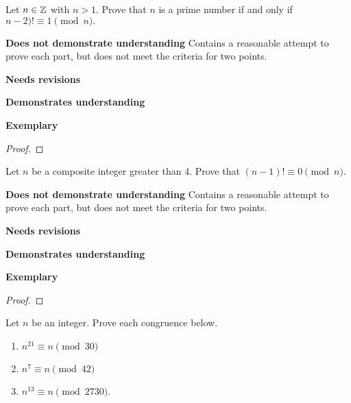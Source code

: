 \documentclass[letterpaper, 11pt]{../ximera}
\begin{document}
\begin{ex}[Exercise 44]
	Let $n\in\mathbb Z$ with $n>1.$ Prove that $n$ is a prime number if and only if $n-2)!\equiv 1\pmod{n}.$
\end{ex}

\begin{writeRubric}
    \item \textbf{Does not demonstrate understanding}
     Contains a reasonable attempt to prove each part, but does not meet the criteria for two points.
    \item \textbf{Needs revisions}
     
    \item \textbf{Demonstrates understanding}
    
    \item \textbf{Exemplary}
        
\end{writeRubric}
                                       \begin{proof}
 
\end{proof}
 
\begin{ex}[Exercise 45]
	Let $n$ be a composite integer greater than 4. Prove that $(n-1)!\equiv 0\pmod{n}$.
\end{ex}

\begin{writeRubric}
    \item \textbf{Does not demonstrate understanding}
     Contains a reasonable attempt to prove each part, but does not meet the criteria for two points.
    \item \textbf{Needs revisions}
     
    \item \textbf{Demonstrates understanding}
    
    \item \textbf{Exemplary}
        
\end{writeRubric}
                                       \begin{proof}
 
\end{proof}

\begin{ex} 
Let $n$ be an integer. Prove each congruence below. 
	\begin{enumerate}[label=(\alph*)]
		\item $n^{21} \equiv n \pmod{30}$
		\item $n^7 \equiv n \pmod{42}$
		\item $n^{13} \equiv n \pmod{2730}$. 
	\end{enumerate}
\end{ex}
\end{document}
